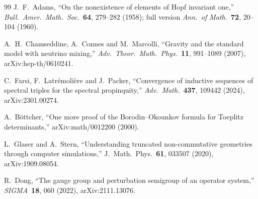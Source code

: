 \documentclass[11pt]{article}
\begin{document}
\begin{thebibliography}{99}
J.~F.~Adams, ``On the nonexistence of elements of Hopf invariant one,''
\textit{Bull.~Amer.~Math.~Soc.}\ \textbf{64}, 279--282 (1958);
full version \textit{Ann.~of Math.}\ \textbf{72}, 20--104 (1960).

A.~H.~Chamseddine, A.~Connes and M.~Marcolli,
``Gravity and the standard model with neutrino mixing,''
\textit{Adv.~Theor.~Math.~Phys.}\ \textbf{11}, 991--1089 (2007),
arXiv:hep-th/0610241.

C.~Farsi, F.~Latr\'emoli\`ere and J.~Packer, ``Convergence of inductive
sequences of spectral triples for the spectral propinquity,''
\textit{Adv.~Math.}\ \textbf{437}, 109442 (2024), arXiv:2301.00274.

A.~B\"ottcher, ``One more proof of the Borodin--Okounkov formula for
Toeplitz determinants,'' arXiv:math/0012200 (2000).

L.~Glaser and A.~Stern, ``Understanding truncated non-commutative
geometries through computer simulations,'' J.\ Math.\ Phys.\
\textbf{61}, 033507 (2020), arXiv:1909.08054.

R.~Dong, ``The gauge group and perturbation semigroup of an operator
system,'' \textit{SIGMA}\ \textbf{18}, 060 (2022), arXiv:2111.13076.

\end{thebibliography}
\end{document}
